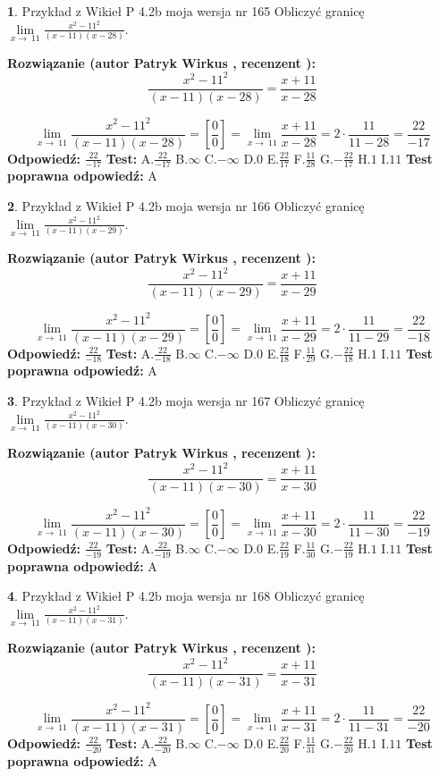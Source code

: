 \documentclass[12pt, a4paper]{article}
\theoremstyle{definition} %
\newtheorem{zad}{}
\newcommand{\zadStart}[1]{\begin{zad}#1\newline}
\newcommand{\zadStop}{\end{zad}}
\newcommand{\rozwStart}[2]{\noindent \textbf{Rozwiązanie (autor #1 , recenzent #2): }\newline}
\newcommand{\rozwStop}{\newline}
\newcommand{\odpStart}{\noindent \textbf{Odpowiedź:}\newline}
\newcommand{\odpStop}{\newline}
\newcommand{\testStart}{\noindent \textbf{Test:}\newline}
\newcommand{\testStop}{\newline}
\newcommand{\kluczStart}{\noindent \textbf{Test poprawna odpowiedź:}\newline}
\newcommand{\kluczStop}{\newline}
\begin{document}
\zadStart{Przykład z Wikieł P 4.2b moja wersja nr 165}
Obliczyć granicę $\lim\limits_{x\to\ 11}\frac{x^{2}-11^{2}}{(x-11)(x-28)}$.
\zadStop
\rozwStart{Patryk Wirkus}{}
$$\frac{x^{2}-11^{2}}{(x-11)(x-28)}=\frac{x+11}{x-28}$$

$$\lim\limits_{x\to\ 11}\frac{x^{2}-11^{2}}{(x-11)(x-28)}=[\frac{0}{0}]=\lim\limits_{x\to\ 11}\frac{x+11}{x-28}=2 \cdot \frac{11}{11-28} = \frac{22}{-17}$$
\rozwStop
\odpStart
$\frac{22}{-17}$
\odpStop
\testStart
A.$\frac{22}{-17}$
B.$\infty$
C.$-\infty$
D.$0$
E.$\frac{22}{17}$
F.$\frac{11}{28}$
G.$-\frac{22}{17}$
H.$1$
I.$11$
\testStop
\kluczStart
A
\kluczStop



\zadStart{Przykład z Wikieł P 4.2b moja wersja nr 166}
Obliczyć granicę $\lim\limits_{x\to\ 11}\frac{x^{2}-11^{2}}{(x-11)(x-29)}$.
\zadStop
\rozwStart{Patryk Wirkus}{}
$$\frac{x^{2}-11^{2}}{(x-11)(x-29)}=\frac{x+11}{x-29}$$

$$\lim\limits_{x\to\ 11}\frac{x^{2}-11^{2}}{(x-11)(x-29)}=[\frac{0}{0}]=\lim\limits_{x\to\ 11}\frac{x+11}{x-29}=2 \cdot \frac{11}{11-29} = \frac{22}{-18}$$
\rozwStop
\odpStart
$\frac{22}{-18}$
\odpStop
\testStart
A.$\frac{22}{-18}$
B.$\infty$
C.$-\infty$
D.$0$
E.$\frac{22}{18}$
F.$\frac{11}{29}$
G.$-\frac{22}{18}$
H.$1$
I.$11$
\testStop
\kluczStart
A
\kluczStop



\zadStart{Przykład z Wikieł P 4.2b moja wersja nr 167}
Obliczyć granicę $\lim\limits_{x\to\ 11}\frac{x^{2}-11^{2}}{(x-11)(x-30)}$.
\zadStop
\rozwStart{Patryk Wirkus}{}
$$\frac{x^{2}-11^{2}}{(x-11)(x-30)}=\frac{x+11}{x-30}$$

$$\lim\limits_{x\to\ 11}\frac{x^{2}-11^{2}}{(x-11)(x-30)}=[\frac{0}{0}]=\lim\limits_{x\to\ 11}\frac{x+11}{x-30}=2 \cdot \frac{11}{11-30} = \frac{22}{-19}$$
\rozwStop
\odpStart
$\frac{22}{-19}$
\odpStop
\testStart
A.$\frac{22}{-19}$
B.$\infty$
C.$-\infty$
D.$0$
E.$\frac{22}{19}$
F.$\frac{11}{30}$
G.$-\frac{22}{19}$
H.$1$
I.$11$
\testStop
\kluczStart
A
\kluczStop



\zadStart{Przykład z Wikieł P 4.2b moja wersja nr 168}
Obliczyć granicę $\lim\limits_{x\to\ 11}\frac{x^{2}-11^{2}}{(x-11)(x-31)}$.
\zadStop
\rozwStart{Patryk Wirkus}{}
$$\frac{x^{2}-11^{2}}{(x-11)(x-31)}=\frac{x+11}{x-31}$$

$$\lim\limits_{x\to\ 11}\frac{x^{2}-11^{2}}{(x-11)(x-31)}=[\frac{0}{0}]=\lim\limits_{x\to\ 11}\frac{x+11}{x-31}=2 \cdot \frac{11}{11-31} = \frac{22}{-20}$$
\rozwStop
\odpStart
$\frac{22}{-20}$
\odpStop
\testStart
A.$\frac{22}{-20}$
B.$\infty$
C.$-\infty$
D.$0$
E.$\frac{22}{20}$
F.$\frac{11}{31}$
G.$-\frac{22}{20}$
H.$1$
I.$11$
\testStop
\kluczStart
A
\kluczStop
\end{document}
